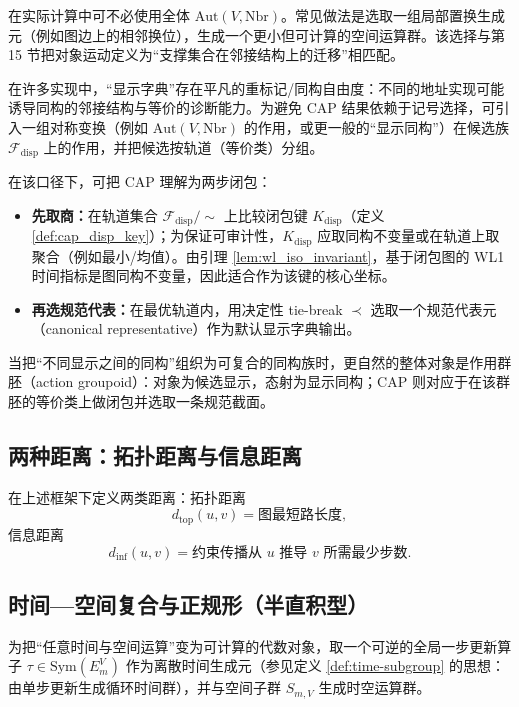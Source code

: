 \begin{remark}
在实际计算中可不必使用全体 $\mathrm{Aut}(V,\mathrm{Nbr})$。常见做法是选取一组局部置换生成元（例如图边上的相邻换位），生成一个更小但可计算的空间运算群。该选择与第 15 节把对象运动定义为“支撑集合在邻接结构上的迁移”相匹配。
\end{remark}

\begin{remark}\label{rem:cap_groupoid}
\AuditTag
在许多实现中，“显示字典”存在平凡的重标记/同构自由度：不同的地址实现可能诱导同构的邻接结构与等价的诊断能力。为避免 CAP 结果依赖于记号选择，可引入一组对称变换（例如 $\mathrm{Aut}(V,\mathrm{Nbr})$ 的作用，或更一般的“显示同构”）在候选族 $\mathcal F_{\mathrm{disp}}$ 上的作用，并把候选按轨道（等价类）分组。\par

在该口径下，可把 CAP 理解为两步闭包：
\begin{itemize}
  \item \textbf{先取商：}在轨道集合 $\mathcal F_{\mathrm{disp}}/\!\sim$ 上比较闭包键 $K_{\mathrm{disp}}$（定义 \ref{def:cap_disp_key}）；为保证可审计性，$K_{\mathrm{disp}}$ 应取同构不变量或在轨道上取聚合（例如最小/均值）。由引理 \ref{lem:wl_iso_invariant}，基于闭包图的 WL1 时间指标是图同构不变量，因此适合作为该键的核心坐标。
  \item \textbf{再选规范代表：}在最优轨道内，用决定性 tie-break $\prec$ 选取一个规范代表元（canonical representative）作为默认显示字典输出。
\end{itemize}
当把“不同显示之间的同构”组织为可复合的同构族时，更自然的整体对象是作用群胚（action groupoid）：对象为候选显示，态射为显示同构；CAP 则对应于在该群胚的等价类上做闭包并选取一条规范截面。
\end{remark}

\subsection{两种距离：拓扑距离与信息距离}

在上述框架下定义两类距离：拓扑距离
$$
d_{\mathrm{top}}(u,v)=\text{图最短路长度},
$$
信息距离
$$
d_{\mathrm{inf}}(u,v)=\text{约束传播从 }u\text{ 推导 }v\text{ 所需最少步数}.
$$

\subsection{时间—空间复合与正规形（半直积型）}

为把“任意时间与空间运算”变为可计算的代数对象，取一个可逆的全局一步更新算子 $\tau\in\mathrm{Sym}(E_m^V)$ 作为离散时间生成元（参见定义 \ref{def:time-subgroup} 的思想：由单步更新生成循环时间群），并与空间子群 $S_{m,V}$ 生成时空运算群。

